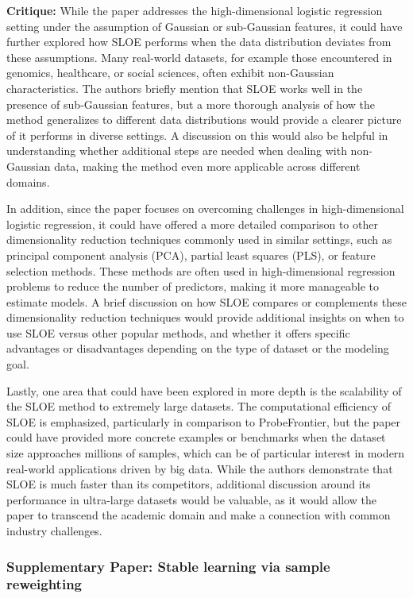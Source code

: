 \documentclass{article}
\theoremstyle{plain}
\theoremstyle{definition}
\theoremstyle{remark}
\begin{document}
\textbf{Critique:} While the paper addresses the high-dimensional logistic regression setting under the assumption of Gaussian or sub-Gaussian features, it could have further explored how SLOE performs when the data distribution deviates from these assumptions. Many real-world datasets, for example those encountered in genomics, healthcare, or social sciences, often exhibit non-Gaussian characteristics. The authors briefly mention that SLOE works well in the presence of sub-Gaussian features, but a more thorough analysis of how the method generalizes to different data distributions would provide a clearer picture of it performs in diverse settings. A discussion on this would also be helpful in understanding whether additional steps are needed when dealing with non-Gaussian data, making the method even more applicable across different domains.

In addition, since the paper focuses on overcoming challenges in high-dimensional logistic regression, it could have offered a more detailed comparison to other dimensionality reduction techniques commonly used in similar settings, such as principal component analysis (PCA), partial least squares (PLS), or feature selection methods. These methods are often used in high-dimensional regression problems to reduce the number of predictors, making it more manageable to estimate models. A brief discussion on how SLOE compares or complements these dimensionality reduction techniques would provide additional insights on when to use SLOE versus other popular methods, and whether it offers specific advantages or disadvantages depending on the type of dataset or the modeling goal.

Lastly, one area that could have been explored in more depth is the scalability of the SLOE method to extremely large datasets. The computational efficiency of SLOE is emphasized, particularly in comparison to ProbeFrontier, but the paper could have provided more concrete examples or benchmarks when the dataset size approaches millions of samples, which can be of particular interest in modern real-world applications driven by big data. While the authors demonstrate that SLOE is much faster than its competitors, additional discussion around its performance in ultra-large datasets would be valuable, as it would allow the paper to transcend the academic domain and make a connection with common industry challenges.

\subsubsection{Supplementary Paper: Stable learning via sample reweighting \cite{shen20}}
\end{document}
